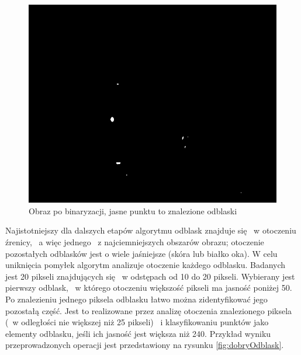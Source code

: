 \begin{figure}
\label{fig:binaryzacja}
\begin{center}
\includegraphics[scale=0.5]{binaryzacja.jpg}
\caption{Obraz po binaryzacji, jasne punktu to znalezione odblaski}
\end{center}
\end{figure}

Najistotniejszy dla dalszych etapów algorytmu odblask znajduje się ~w otoczeniu źrenicy, ~a więc jednego ~z najciemniejszych obszarów obrazu; otoczenie pozostałych odblasków jest o wiele jaśniejsze (skóra lub białko oka). W celu uniknięcia pomyłek algorytm analizuje otoczenie każdego odblasku. Badanych jest 20 pikseli znajdujących się ~w odstępach od 10 do 20 pikseli. Wybierany jest pierwszy odblask, ~w którego otoczeniu większość pikseli ma jasność poniżej 50. Po znalezieniu jednego piksela odblasku łatwo można zidentyfikować jego pozostałą część. Jest to realizowane przez analizę otoczenia znalezionego piksela (~w odległości nie większej niż 25 pikseli) ~i klasyfikowaniu punktów jako elementy odblasku, jeśli ich jasność jest większa niż 240. Przykład wyniku przeprowadzonych operacji jest przedstawiony na rysunku \ref{fig:dobryOdblask}.

